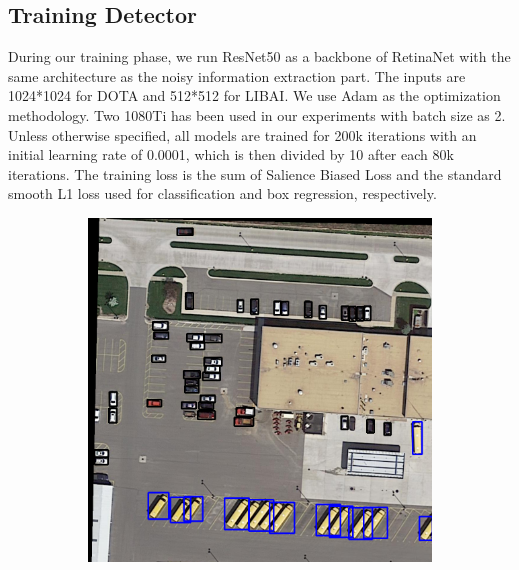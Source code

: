 \documentclass[conference]{IEEEtran}
\begin{document}
    \subsection{Training Detector}
    During our training phase, we run ResNet50\cite{he2016deep} as a backbone of RetinaNet\cite{lin2017focal} with the same architecture as the noisy information extraction part. The inputs are 1024*1024 for DOTA and 512*512 for LIBAI. We use Adam as the optimization methodology. Two 1080Ti has been used in our experiments with batch size as 2. Unless otherwise specified, all models are trained for 200k iterations with an initial learning rate of 0.0001, which is then divided by 10 after each 80k iterations. The training loss is the sum of Salience Biased Loss and the standard smooth L1 loss used for classification and box regression, respectively.
    \begin{figure}[h!]
  	\centering
   	\begin{subfigure}[b]{0.4\linewidth}
    	\includegraphics[width=\linewidth]{P0015__1__0___0.png}
   	\end{subfigure}
  	\begin{subfigure}[b]{0.4\linewidth}

\end{subfigure}
\end{figure}
\end{document}
